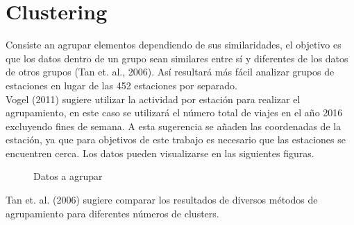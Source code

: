 \documentclass[12pt,spanish]{article}
\begin{document}
	\section{Clustering}
	Consiste an agrupar elementos dependiendo de sus similaridades, el objetivo es que los datos dentro de un grupo sean similares entre sí y diferentes de los datos de otros grupos (Tan et. al., 2006).	Así resultará más fácil analizar grupos de estaciones en lugar de las 452 estaciones por separado.\\
	Vogel (2011) sugiere utilizar la actividad por estación para realizar el agrupamiento, en este caso se utilizará el número total de viajes en el año 2016 excluyendo fines de semana. A esta sugerencia se añaden las coordenadas de la estación, ya que para objetivos de este trabajo es necesario que las estaciones se encuentren cerca. Los datos pueden visualizarse en las siguientes figuras.\\
	\begin{figure}[H]%
		\centering
		\qquad
		\caption{Datos a agrupar}%
		\label{fig:example}%
	\end{figure}

	Tan et. al. (2006) sugiere comparar los resultados de diversos métodos de agrupamiento para diferentes números de clusters.
	
\end{document}
